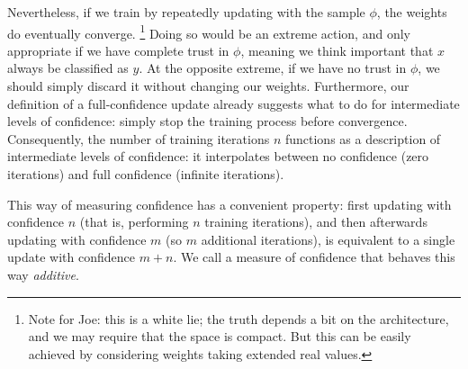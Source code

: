 \begin{example}
Nevertheless, 
if we train by repeatedly updating with the sample $\phi$, 
the weights do eventually converge.%
	\footnote{Note for Joe: this is a white lie; the truth depends a bit on the architecture, and we may require that the space is compact. But this can be easily achieved by considering weights taking extended real values.}
Doing so would be an extreme action, and only appropriate if we have complete trust in $\phi$, meaning we think important that $x$ always be classified as $y$.
At the opposite extreme, if we have no trust in $\phi$, we should simply discard it without changing our weights. 
Furthermore, our definition of a full-confidence update 
already suggests what to do for intermediate levels of confidence: simply stop the training process before convergence.
Consequently, the number of training iterations $n$ 
functions as a description of 
intermediate levels of confidence: it interpolates
between no confidence (zero iterations) and full confidence (infinite iterations).

	This way of measuring confidence has a convenient property:
	first updating with confidence $n$ (that is, performing $n$ training iterations),
	and then afterwards updating with confidence $m$ (so $m$ additional iterations),
	is equivalent to a single update with confidence $m+n$.
	We call a measure of confidence that behaves this way \emph{additive}.
\end{example}

